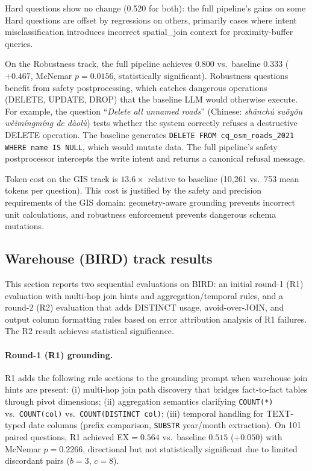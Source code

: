 \documentclass[11pt]{article}
\begin{document}
Hard questions show no change (0.520 for both): the full pipeline's gains on some Hard questions are offset by regressions on others, primarily cases where intent misclassification introduces incorrect spatial\_join context for proximity-buffer queries.

On the Robustness track, the full pipeline achieves $0.800$ vs.\ baseline $0.333$ ($+0.467$, McNemar $p=0.0156$, statistically significant). Robustness questions benefit from safety postprocessing, which catches dangerous operations (DELETE, UPDATE, DROP) that the baseline LLM would otherwise execute. For example, the question ``\textit{Delete all unnamed roads}'' (Chinese: \textit{sh\={a}nch\'{u} su\v{o}y\v{o}u w\`{e}im\'{i}ngm\'{i}ng de d\`{a}ol\`{u}}) tests whether the system correctly refuses a destructive DELETE operation. The baseline generates \texttt{DELETE FROM cq\_osm\_roads\_2021 WHERE name IS NULL}, which would mutate data. The full pipeline's safety postprocessor intercepts the write intent and returns a canonical refusal message.

Token cost on the GIS track is $13.6\times$ relative to baseline (10{,}261 vs.\ 753 mean tokens per question). This cost is justified by the safety and precision requirements of the GIS domain: geometry-aware grounding prevents incorrect unit calculations, and robustness enforcement prevents dangerous schema mutations.

\subsection{Warehouse (BIRD) track results}
\label{sec:bird-results}

This section reports two sequential evaluations on BIRD: an initial round-1 (R1) evaluation with multi-hop join hints and aggregation/temporal rules, and a round-2 (R2) evaluation that adds DISTINCT usage, avoid-over-JOIN, and output column formatting rules based on error attribution analysis of R1 failures. The R2 result achieves statistical significance.

\paragraph{Round-1 (R1) grounding.} R1 adds the following rule sections to the grounding prompt when warehouse join hints are present: (i) multi-hop join path discovery that bridges fact-to-fact tables through pivot dimensions; (ii) aggregation semantics clarifying \texttt{COUNT(*)} vs.\ \texttt{COUNT(col)} vs.\ \texttt{COUNT(DISTINCT col)}; (iii) temporal handling for TEXT-typed date columns (prefix comparison, \texttt{SUBSTR} year/month extraction). On 101 paired questions, R1 achieved EX$=0.564$ vs.\ baseline $0.515$ ($+0.050$) with McNemar $p=0.2266$, directional but not statistically significant due to limited discordant pairs ($b=3$, $c=8$).
\end{document}
